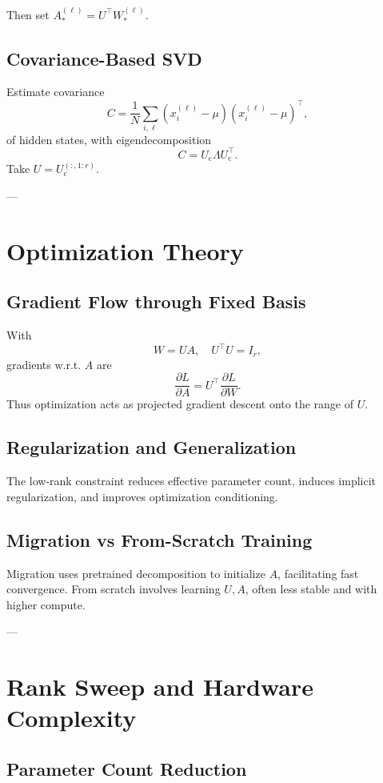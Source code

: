 \documentclass[11pt]{article}
\theoremstyle{definition}
\begin{document}
Then set \(A_*^{(\ell)} = U^\top W_*^{(\ell)}\).

\subsection{Covariance-Based SVD}

Estimate covariance
\[
C = \frac{1}{N} \sum_{i, \ell} (x_i^{(\ell)} - \mu)(x_i^{(\ell)} - \mu)^\top,
\]
of hidden states, with eigendecomposition
\[
C = U_{\text{c}} \Lambda U_{\text{c}}^\top.
\]
Take \(U = U_{\text{c}}^{(:,1:r)}\).

---

\section{Optimization Theory}

\subsection{Gradient Flow through Fixed Basis}

With
\[
W = U A,
\quad U^\top U = I_r,
\]
gradients w.r.t. \(A\) are
\[
\frac{\partial L}{\partial A} = U^\top \frac{\partial L}{\partial W}.
\]
Thus optimization acts as projected gradient descent onto the range of \(U\).

\subsection{Regularization and Generalization}

The low-rank constraint reduces effective parameter count, induces implicit regularization, and improves optimization conditioning.

\subsection{Migration vs From-Scratch Training}

Migration uses pretrained decomposition to initialize \(A\), facilitating fast convergence. From scratch involves learning \(U, A\), often less stable and with higher compute.

---

\section{Rank Sweep and Hardware Complexity}

\subsection{Parameter Count Reduction}
\end{document}
